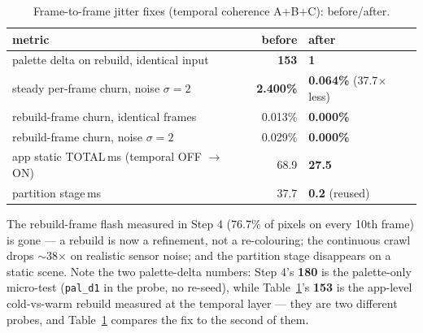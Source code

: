\documentclass[11pt,a4paper]{article}
\begin{document}
\begin{table}[htbp]
\centering
\begin{tabular}{@{}l r l@{}}
\toprule
\textbf{metric} & \textbf{before} & \textbf{after}\\
\midrule
palette delta on rebuild, identical input & \textbf{153} & \textbf{1} \\
steady per-frame churn, noise $\sigma=2$   & \textbf{2.400\%} & \textbf{0.064\%} (37.7$\times$ less) \\
rebuild-frame churn, identical frames     & 0.013\% & \textbf{0.000\%} \\
rebuild-frame churn, noise $\sigma=2$     & 0.029\% & \textbf{0.000\%} \\
app static TOTAL\,ms (temporal OFF $\rightarrow$ ON) & 68.9 & \textbf{27.5} \\
partition stage\,ms                       & 37.7 & \textbf{0.2} (reused) \\
\bottomrule
\end{tabular}
\caption{Frame-to-frame jitter fixes (temporal coherence A+B+C): before/after.}
\label{tab:jitter}
\end{table}

The rebuild-frame flash measured in Step 4 (76.7\% of pixels on every 10th frame)
is gone --- a rebuild is now a refinement, not a re-colouring; the continuous
crawl drops $\sim$38$\times$ on realistic sensor noise; and the partition stage
disappears on a static scene. Note the two palette-delta numbers: Step 4's
\textbf{180} is the palette-only micro-test (\texttt{pal\_d1} in the probe, no
re-seed), while Table~\ref{tab:jitter}'s \textbf{153} is the app-level
cold-vs-warm rebuild measured at the temporal layer --- they are two different
probes, and Table~\ref{tab:jitter} compares the fix to the second of them.
\end{document}
